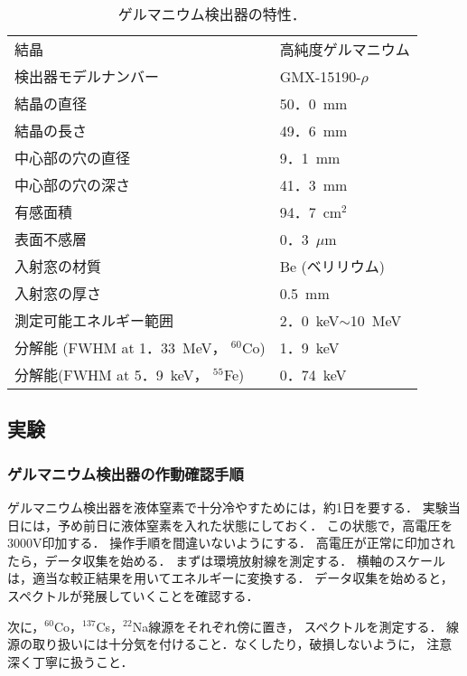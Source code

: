 \documentclass[a4j,10pt,oneside,openany]{jsbook}
\begin{document}
{\begin{table}
  \begin{center}
    \caption{ゲルマニウム検出器の特性．}
    \begin{tabular}{ll}
      \hline\hline
      結晶 & 高純度ゲルマニウム \\
      検出器モデルナンバー & GMX-15190-$\rho$ \\
      結晶の直径 & 50．0~mm \\
      結晶の長さ & 49．6~mm \\
      中心部の穴の直径  & 9．1~mm \\
      中心部の穴の深さ  & 41．3~mm \\
      有感面積 & 94．7~cm$^2$ \\
      表面不感層 & 0．3~$\mu$m \\
      入射窓の材質 & Be (ベリリウム) \\
      入射窓の厚さ & 0.5~mm \\
      測定可能エネルギー範囲 & 2．0~keV$\sim$10~MeV \\
      分解能 (FWHM at 1．33~MeV， $^{60}$Co) & 1．9~keV \\
      分解能(FWHM at 5．9~keV， $^{55}$Fe) & 0．74~keV\\
      \hline\hline
    \end{tabular}
    \label{table:ge-detector}
  \end{center}
\end{table}

\subsection{実験}

\subsubsection{ゲルマニウム検出器の作動確認手順}

ゲルマニウム検出器を液体窒素で十分冷やすためには，約1日を要する．
実験当日には，予め前日に液体窒素を入れた状態にしておく．
この状態で，高電圧を3000V印加する．
操作手順を間違いないようにする．
高電圧が正常に印加されたら，データ収集を始める．
まずは環境放射線を測定する．
横軸のスケールは，適当な較正結果を用いてエネルギーに変換する．
データ収集を始めると，スペクトルが発展していくことを確認する．

次に，$^{60}$Co，$^{137}$Cs，$^{22}$Na線源をそれぞれ傍に置き，
スペクトルを測定する．
線源の取り扱いには十分気を付けること．なくしたり，破損しないように，
注意深く丁寧に扱うこと．

}
\end{document}
